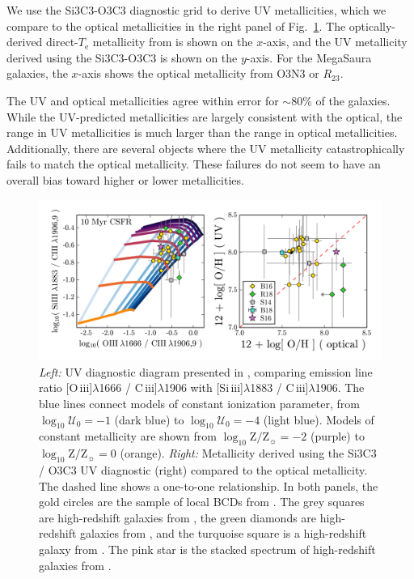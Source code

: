 \documentclass[preprint2]{aastex62}
\newcommand{\oiii}{[O\,{\sc iii}]\xspace}
\newcommand{\SiuIII}{[Si\,{\sc iii}]\xspace}
\newcommand{\ciii}{C\,{\sc iii}]\xspace}
\newcommand{\logten}{\ensuremath{\log_{10}}}
\newcommand{\logZeq}[1]{\ensuremath{\logten \mathrm{Z}/\mathrm{Z}_{\sun} = #1}}
\newcommand{\logUeq}[1]{\ensuremath{\logten \mathcal{U}_0 = #1}}
\newcommand{\mage}{{\sc Meg}a{\sc S}a{\sc ura}\xspace}
\newcommand{\Te}{\ensuremath{T_{\mathrm{e}}}\xspace}
\begin{document}
We use the Si3C3-O3C3 diagnostic grid to derive UV metallicities, which we compare to the optical metallicities in the right panel of Fig.~\ref{fig:UVC}. The optically-derived direct-\Te metallicity from \citet{Berg+2016} is shown on the $x$-axis, and the UV metallicity derived using the Si3C3-O3C3 is shown on the $y$-axis. For the \mage galaxies, the $x$-axis shows the optical metallicity from O3N3 or $R_{23}$.

The UV and optical metallicities agree within error for ${\sim}80\%$ of the \citet{Berg+2016} galaxies. While the UV-predicted metallicities are largely consistent with the optical, the range in UV metallicities is much larger than the range in optical metallicities. Additionally, there are several objects where the UV metallicity catastrophically fails to match the optical metallicity. These failures do not seem to have an overall bias toward higher or lower metallicities.

\begin{figure}
  \begin{center}
    \includegraphics[width=\linewidth]{figs/f3.png}
    \caption{\emph{Left:} UV diagnostic diagram presented in \citet{Byler+2018}, comparing emission line ratio \oiii$\lambda$1666 / \ciii$\lambda$1906 with \SiuIII$\lambda$1883 / \ciii$\lambda$1906. The blue lines connect models of constant ionization parameter, from \logUeq{-1} (dark blue) to \logUeq{-4} (light blue). Models of constant metallicity are shown from \logZeq{-2} (purple) to \logZeq{0} (orange). \emph{Right:} Metallicity derived using the Si3C3 / O3C3 UV diagnostic (right) compared to the optical metallicity. The dashed line shows a one-to-one relationship. In both panels, the gold circles are the sample of local BCDs from \citet{Berg+2016}. The grey squares are high-redshift galaxies from \citet{Stark+2014}, the green diamonds are high-redshift galaxies from \citet{Rigby+2018b}, and the turquoise square is a high-redshift galaxy from \citet{Berg+2018}. The pink star is the stacked spectrum of high-redshift galaxies from \citet{Steidel+2016}.}
    \label{fig:UVC}
  \end{center}
\end{figure}
\end{document}
